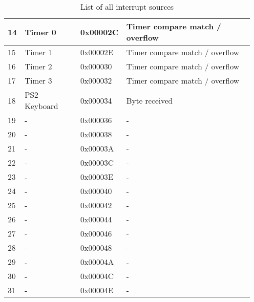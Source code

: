 \begin{table}[]
\begin{tabular}{|l|l|l|l|}
        14                  & Timer 0             & 0x00002C        & Timer compare match / overflow \\ \hline
        15                  & Timer 1             & 0x00002E        & Timer compare match / overflow \\ \hline
        16                  & Timer 2             & 0x000030        & Timer compare match / overflow \\ \hline
        17                  & Timer 3             & 0x000032        & Timer compare match / overflow \\ \hline
        18                  & PS2 Keyboard        & 0x000034        & Byte received                  \\ \hline
        19                  & -                   & 0x000036        & -                              \\ \hline
        20                  & -                   & 0x000038        & -                              \\ \hline
        21                  & -                   & 0x00003A        & -                              \\ \hline
        22                  & -                   & 0x00003C        & -                              \\ \hline
        23                  & -                   & 0x00003E        & -                              \\ \hline
        24                  & -                   & 0x000040        & -                              \\ \hline
        25                  & -                   & 0x000042        & -                              \\ \hline
        26                  & -                   & 0x000044        & -                              \\ \hline
        27                  & -                   & 0x000046        & -                              \\ \hline
        28                  & -                   & 0x000048        & -                              \\ \hline
        29                  & -                   & 0x00004A        & -                              \\ \hline
        30                  & -                   & 0x00004C        & -                              \\ \hline
        31                  & -                   & 0x00004E        & -                              \\ \hline
    \end{tabular}
    \caption{List of all interrupt sources}
    \label{tab:intsources}
\end{table}


